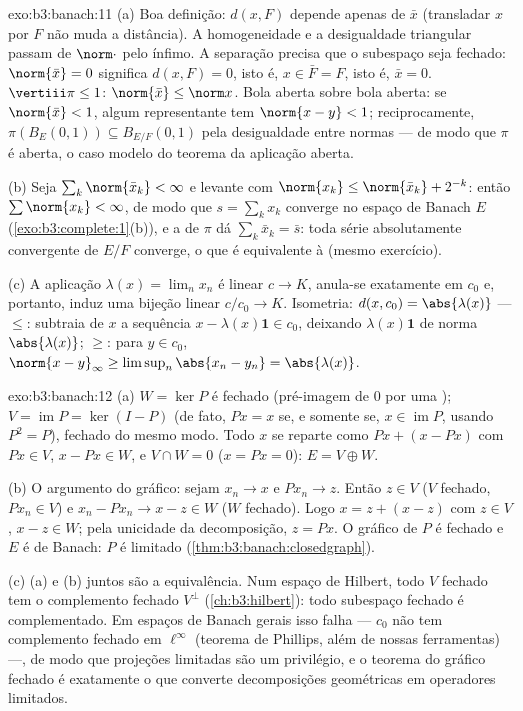 \begin{solution}{exo:b3:banach:11}
(a) Boa definição: $d(x, F)$ depende apenas de $\bar x$
(transladar $x$ por $F$ não muda a distância).
A homogeneidade e a desigualdade triangular passam de $\norm\cdot$
pelo ínfimo. A separação precisa que o subespaço seja fechado: $\norm{\bar
x} = 0$ significa $d(x, F) = 0$, isto é, $x \in \bar F = F$, isto é,
$\bar x = 0$. $\vertiii\pi \leq 1$: $\norm{\bar x} \leq
\norm x$. Bola aberta sobre bola aberta: se $\norm{\bar x} < 1$,
algum representante tem $\norm{x - y} < 1$; reciprocamente,
$\pi(B_E(0,1)) \subseteq B_{E/F}(0,1)$ pela desigualdade entre
normas --- de modo que $\pi$ é aberta, o caso modelo do teorema da
aplicação aberta.

(b) Seja $\sum_k\norm{\bar x_k} < \infty$ e levante com
$\norm{x_k} \leq \norm{\bar x_k} + 2^{-k}$: então
$\sum\norm{x_k} < \infty$, de modo que $s = \sum_kx_k$ converge no
espaço de Banach $E$ (\cref{exo:b3:complete:1}(b)), e a 
de $\pi$ dá $\sum_k\bar x_k = \bar s$: toda série absolutamente
convergente de $E/F$ converge, o que é equivalente à
 (mesmo exercício).

(c) A aplicação $\lambda(x) = \lim_nx_n$ é linear $c \to K$,
anula-se exatamente em $c_0$ e, portanto, induz uma bijeção linear
$c/c_0 \to K$. Isometria: $d(x, c_0) = \abs{\lambda(x)}$ ---
$\leq$: subtraia de $x$ a sequência $x - \lambda(x)\mathbf
1 \in c_0$, deixando $\lambda(x)\mathbf 1$ de norma
$\abs{\lambda(x)}$; $\geq$: para $y \in c_0$, $\norm{x -
y}_\infty \geq \limsup_n\abs{x_n - y_n} = \abs{\lambda(x)}$.
\end{solution}

\begin{solution}{exo:b3:banach:12}
(a) $W = \ker P$ é fechado (pré-imagem de $0$ por uma
); $V = \operatorname{im}P = \ker(I - P)$
(de fato, $Px = x$ se, e somente se, $x \in \operatorname{im}P$, usando $P^2 =
P$), fechado do mesmo modo. Todo $x$ se reparte como $Px + (x - Px)$
com $Px \in V$, $x - Px \in W$, e $V \cap W = 0$ ($x = Px
= 0$): $E = V \oplus W$.

(b) O argumento do gráfico: sejam $x_n \to x$ e $Px_n \to z$.
Então $z \in V$ ($V$ fechado, $Px_n \in V$) e $x_n - Px_n \to
x - z \in W$ ($W$ fechado). Logo $x = z + (x - z)$ com $z \in
V$, $x - z \in W$; pela unicidade da decomposição, $z =
Px$. O gráfico de $P$ é fechado e $E$ é de Banach: $P$ é
limitado (\cref{thm:b3:banach:closedgraph}).

(c) (a) e (b) juntos são a equivalência. Num espaço de Hilbert,
todo $V$ fechado tem o complemento fechado $V^\perp$
(\cref{ch:b3:hilbert}): todo subespaço fechado é
complementado. Em espaços de Banach gerais isso falha --- $c_0$
não tem complemento fechado em $\ell^\infty$ (teorema de
Phillips, além de nossas ferramentas) ---, de modo que projeções limitadas são um
privilégio, e o teorema do gráfico fechado é exatamente o que
converte decomposições geométricas em operadores limitados.
\end{solution}

